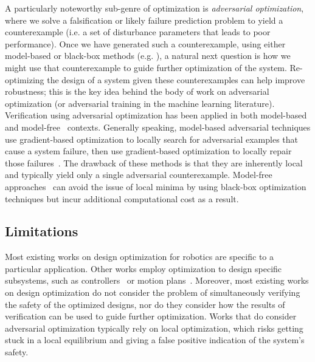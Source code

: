 A particularly noteworthy sub-genre of optimization is \textit{adversarial optimization}, where we solve a falsification or likely failure prediction problem to yield a counterexample (i.e. a set of disturbance parameters that leads to poor performance).
% 
Once we have generated such a counterexample, using either model-based or black-box methods (e.g. \cite{xuSafeBenchBenchmarkingPlatform2022,riedmaierSurveyScenarioBasedSafety2020,okellyScalableEndtoEndAutonomous2018,corsoAdaptiveStressTesting2019,wangAdvSimGeneratingSafetyCritical2021,sunCornerCaseGeneration2021,zhongGuidedConditionalDiffusion2022,corsoInterpretableSafetyValidation2020a,zhangAdversarialRobustnessTrajectory2022,hanselmannKINGGeneratingSafetyCritical2022a}), a natural next question is how we might use that counterexample to guide further optimization of the system. Re-optimizing the design of a system given these counterexamples can help improve robustness; this is the key idea behind the body of work on adversarial optimization (or adversarial training in the machine learning literature). Verification using adversarial optimization has been applied in both model-based~\cite{dontiAdversariallyRobustLearning2021} and model-free~\cite{corsoSurveyAlgorithmsBlackBox2021} contexts. Generally speaking, model-based adversarial techniques use gradient-based optimization to locally search for adversarial examples that cause a system failure, then use gradient-based optimization to locally repair those failures~\cite{dontiAdversariallyRobustLearning2021,dawsonRobustCounterexampleguidedOptimization2022b}. The drawback of these methods is that they are inherently local and typically yield only a single adversarial counterexample. Model-free approaches~\cite{corsoSurveyAlgorithmsBlackBox2021} can avoid the issue of local minima by using black-box optimization techniques but incur additional computational cost as a result.

\subsection{Limitations}

Most existing works on design optimization for robotics are specific to a particular application. Other works employ optimization to design specific subsystems, such as controllers~\cite{xu_uav_controllers} or motion plans~\cite{schulmanMotionPlanningSequential2014}. Moreover, most existing works on design optimization do not consider the problem of simultaneously verifying the safety of the optimized designs, nor do they consider how the results of verification can be used to guide further optimization. Works that do consider adversarial optimization typically rely on local optimization, which risks getting stuck in a local equilibrium and giving a false positive indication of the system's safety.

